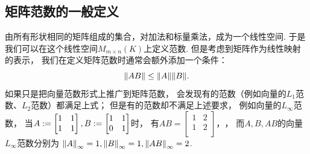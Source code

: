 \subsection{矩阵范数的一般定义}
由所有形状相同的矩阵组成的集合，对加法和标量乘法，成为一个线性空间.
于是我们可以在这个线性空间\(M_{m \times n}(K)\)上定义范数.
但是考虑到矩阵作为线性映射的表示，
我们在定义矩阵范数时通常会额外添加一个条件：
\begin{equation*}
	\norm{A B} \leq \norm{A} \norm{B}.
\end{equation*}
如果只是把向量范数形式上推广到矩阵范数，
会发现有的范数（例如向量的\(L_1\)范数、\(L_2\)范数）都满足上式；
但是有的范数却不满足上述要求，
例如向量的\(L_\infty\)范数，
当\(
	A := \begin{bmatrix}
		1 & 1 \\
		1 & 1 \\
	\end{bmatrix},
	B := \begin{bmatrix}
		1 & 1 \\
		0 & 1 \\
	\end{bmatrix}
\)时，
有\(
	A B = \begin{bmatrix}
		1 & 2 \\
		1 & 2 \\
	\end{bmatrix}，
\)，
而\(A,B,AB\)的向量\(L_\infty\)范数分别为
\(
	\norm{A}_\infty = 1,
	\norm{B}_\infty = 1,
	\norm{AB}_\infty = 2
\).


